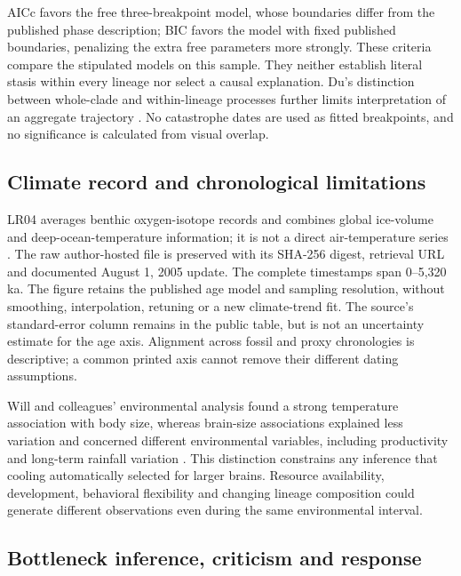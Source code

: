AICc favors the free three-breakpoint model, whose boundaries differ from the published phase description; BIC favors the model with fixed published boundaries, penalizing the extra free parameters more strongly. These criteria compare the stipulated models on this sample. They neither establish literal stasis within every lineage nor select a causal explanation. Du's distinction between whole-clade and within-lineage processes further limits interpretation of an aggregate trajectory \citep{du2018}. No catastrophe dates are used as fitted breakpoints, and no significance is calculated from visual overlap.



\subsection{Climate record and chronological limitations}

LR04 averages \MwcClimateRecords{} benthic oxygen-isotope records and combines global ice-volume and deep-ocean-temperature information; it is not a direct air-temperature series \citep{lisiecki2005}. The raw author-hosted file is preserved with its SHA-256 digest, retrieval URL and documented August 1, 2005 update. The complete \MwcClimateN{} timestamps span 0--5,320 ka. The figure retains the published age model and sampling resolution, without smoothing, interpolation, retuning or a new climate-trend fit. The source's standard-error column remains in the public table, but is not an uncertainty estimate for the age axis. Alignment across fossil and proxy chronologies is descriptive; a common printed axis cannot remove their different dating assumptions.

Will and colleagues' environmental analysis found a strong temperature association with body size, whereas brain-size associations explained less variation and concerned different environmental variables, including productivity and long-term rainfall variation \citep{will2021}. This distinction constrains any inference that cooling automatically selected for larger brains. Resource availability, development, behavioral flexibility and changing lineage composition could generate different observations even during the same environmental interval.

\subsection{Bottleneck inference, criticism and response}


